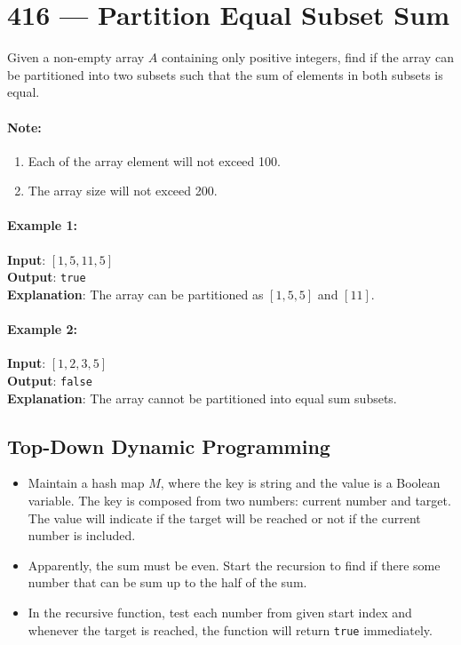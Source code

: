 \section{416 --- Partition Equal Subset Sum}
Given a non-empty array $A$ containing only positive integers, find if the array can be partitioned into two subsets such that the sum of elements in both subsets is equal.

\paragraph{Note:}

\begin{enumerate}
\item Each of the array element will not exceed 100.
\item The array size will not exceed 200.
\end{enumerate}


\paragraph{Example 1:}

\begin{flushleft}
\textbf{Input}: $[1, 5, 11, 5]$
\\
\textbf{Output}: \texttt{true}
\\
\textbf{Explanation}: The array can be partitioned as $[1, 5, 5]$ and $[11]$.
\end{flushleft}

 
\paragraph{Example 2:}

\begin{flushleft}
\textbf{Input}: $[1, 2, 3, 5]$
\\
\textbf{Output}: \texttt{false}
\\
\textbf{Explanation}: The array cannot be partitioned into equal sum subsets.
\end{flushleft}

\subsection{Top-Down Dynamic Programming}
\begin{itemize}
\item Maintain a hash map $M$, where the key is string and the value is a Boolean variable. The key is composed from two numbers: current number and target. The value will indicate if the target will be reached or not if the current number is included.
\item Apparently, the sum must be even. Start the recursion to find if there some number that can be sum up to the half of the sum.
\item In the recursive function, test each number from given start index and whenever the target is reached, the function will return \texttt{true} immediately.
\end{itemize}

